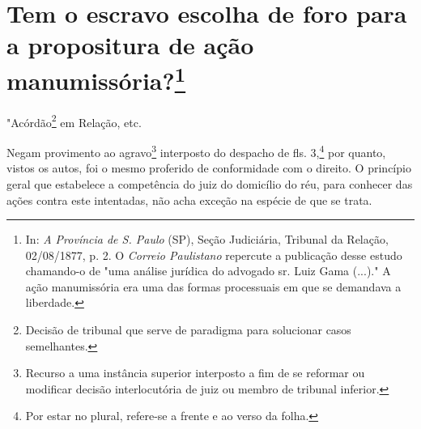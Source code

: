 \chapter{Tem o escravo escolha de foro para a propositura de ação
manumissória?\footnote[*]{In: \emph{A Província de S. Paulo} (SP), Seção
  Judiciária, Tribunal da Relação, 02/08/1877, p. 2. O \emph{Correio
  Paulistano} repercute a publicação desse estudo chamando-o de "uma
  análise jurídica do advogado sr. Luiz Gama (...)." A ação manumissória
  era uma das formas processuais em que se demandava a liberdade.}}


"Acórdão\footnote{Decisão de tribunal que serve de paradigma para
  solucionar casos semelhantes.} em Relação, etc.

Negam provimento ao agravo\footnote{Recurso a uma instância superior
  interposto a fim de se reformar ou modificar decisão interlocutória de
  juiz ou membro de tribunal inferior.} interposto do despacho de fls.
3,\footnote{Por estar no plural, refere-se a frente e ao verso da
  folha.} por quanto, vistos os autos, foi o mesmo proferido de
conformidade com o direito. O princípio geral que estabelece a
competência do juiz do domicílio do réu, para conhecer das ações contra
este intentadas, não acha exceção na espécie de que se trata.

